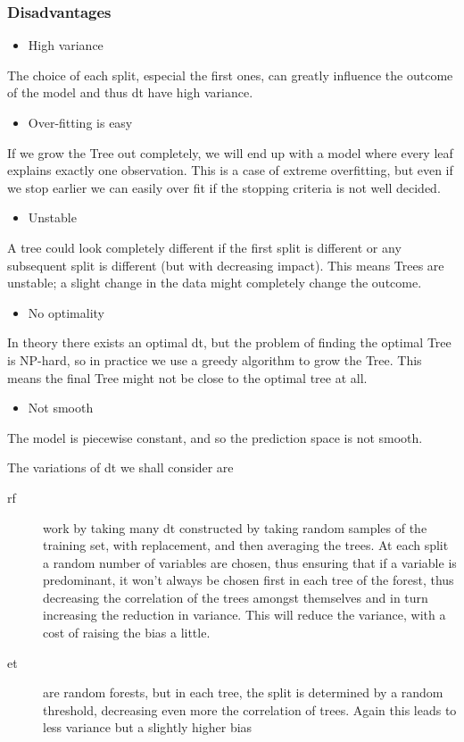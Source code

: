 \subsubsection{Disadvantages}
\begin{itemize}
\item High variance
\end{itemize}

The choice of each split, especial the first ones, can greatly influence the outcome of the model and thus \acrshort{dt} have high variance.

\begin{itemize}
\item Over-fitting is easy
\end{itemize}
If we grow the Tree out completely, we will end up with a model where every leaf explains exactly one observation. This is a case of extreme overfitting, but even if we stop earlier we can easily over fit if the stopping criteria is not well decided.
\begin{itemize}
\item Unstable
\end{itemize}
A tree could look completely different if the first split is different or any subsequent split is different (but with decreasing impact). This means Trees are unstable; a slight change in the data might completely change the outcome.
\begin{itemize}
\item No optimality
\end{itemize}
In theory there exists an optimal \acrshort{dt}, but the problem of finding the optimal Tree is NP-hard, so in practice we use a greedy algorithm to grow the Tree. This means the final Tree might not be close to the optimal tree at all.
\begin{itemize}
\item Not smooth
\end{itemize}
The model is piecewise constant, and so the prediction space is not smooth.


The variations of \acrlong{dt} we shall consider are

\begin{description}
\item [\acrfull{rf} \cite{RFpaper}] work by taking many \acrlong{dt} constructed by taking random samples of the training set, with replacement, and then averaging the trees. At each split a random number of variables are chosen, thus ensuring that if a variable is predominant, it won't always be chosen first in each tree of the forest, thus decreasing the correlation of the trees amongst themselves and in turn increasing the reduction in variance.
This will reduce the variance, with a cost of raising the bias a little.

\item [\acrfull{et} \cite{ETpaper}] are random forests, but in each tree, the split is determined by a random threshold, decreasing even more the correlation of trees. 
Again this leads to less variance but a slightly higher bias
\end{description}


